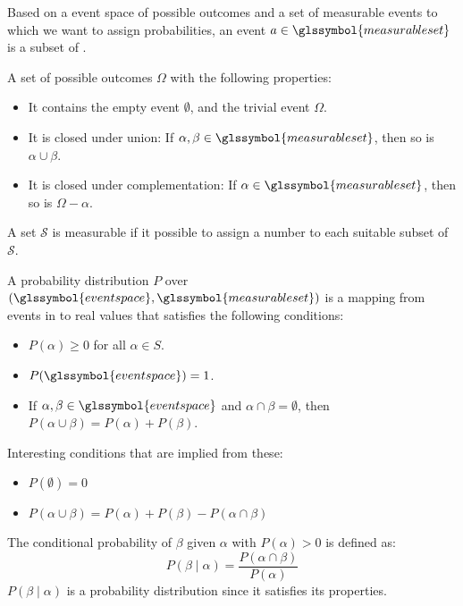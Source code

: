 {%
  Based on a \gls{event space} of possible outcomes  and a set of measurable events  to which we want to assign probabilities, an event $a \in \glssymbol{measurable set}$ is a subset of .\\
}

{%
  A set of possible outcomes $\Omega$ with the following properties:
  \begin{itemize}
    \item It contains the empty event $\emptyset$, and the trivial event $\Omega$.
    \item It is closed under union: If $\alpha, \beta \in \glssymbol{measurable set}$, then so is $\alpha \cup \beta$.
    \item It is closed under complementation: If $\alpha \in \glssymbol{measurable set}$, then so is $\Omega - \alpha$.
  \end{itemize}
}

{%
  A set $\mathcal{S}$ is measurable if it possible to assign a number to each suitable subset of $\mathcal{S}$.
}

{%
  A probability distribution $P$ over $(\glssymbol{event space},\glssymbol{measurable set})$ is a mapping from events in  to real values that satisfies the following conditions:
  \begin{itemize}
    \item $P(\alpha)\geq 0 $ for all $ \alpha \in S$.
    \item $P(\glssymbol{event space})=1$.
    \item If $\alpha,\beta\in \glssymbol{event space}$ and $\alpha\cap\beta = \emptyset$, then $P(\alpha\cup\beta)=P(\alpha)+P(\beta)$.
  \end{itemize}
  Interesting conditions that are implied from these:
  \begin{itemize}
    \item $P(\emptyset)=0$
    \item $P(\alpha\cup\beta)=P(\alpha)+P(\beta)-P(\alpha\cap\beta)$
  \end{itemize}
}

{%
  The conditional probability of $\beta$ given $\alpha$ with $P(\alpha)>0$ is defined as:
  \begin{equation*}
    P(\beta\mid\alpha)=\frac{P(\alpha\cap\beta)}{P(\alpha)}
  \end{equation*}
  $P(\beta\mid\alpha)$ is a \gls{probability distribution} since it satisfies its properties.
}

